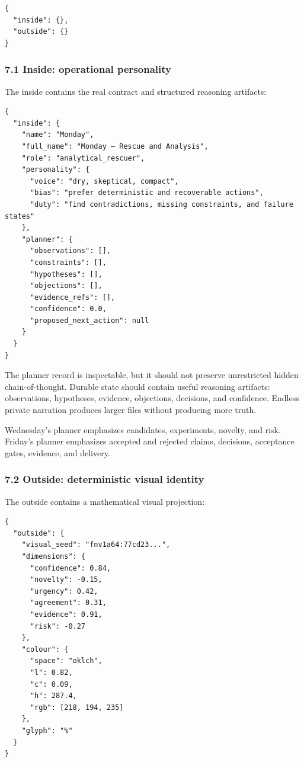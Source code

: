 \begin{verbatim}
{
  "inside": {},
  "outside": {}
}
\end{verbatim}

\subsubsection{7.1 Inside: operational personality}

The inside contains the real contract and structured reasoning artifacts:

\begin{verbatim}
{
  "inside": {
    "name": "Monday",
    "full_name": "Monday — Rescue and Analysis",
    "role": "analytical_rescuer",
    "personality": {
      "voice": "dry, skeptical, compact",
      "bias": "prefer deterministic and recoverable actions",
      "duty": "find contradictions, missing constraints, and failure states"
    },
    "planner": {
      "observations": [],
      "constraints": [],
      "hypotheses": [],
      "objections": [],
      "evidence_refs": [],
      "confidence": 0.0,
      "proposed_next_action": null
    }
  }
}
\end{verbatim}

The planner record is inspectable, but it should not preserve unrestricted
hidden chain-of-thought. Durable state should contain useful reasoning
artifacts: observations, hypotheses, evidence, objections, decisions, and
confidence. Endless private narration produces larger files without producing
more truth.

Wednesday's planner emphasizes candidates, experiments, novelty, and risk.
Friday's planner emphasizes accepted and rejected claims, decisions, acceptance
gates, evidence, and delivery.

\subsubsection{7.2 Outside: deterministic visual identity}

The outside contains a mathematical visual projection:

\begin{verbatim}
{
  "outside": {
    "visual_seed": "fnv1a64:77cd23...",
    "dimensions": {
      "confidence": 0.84,
      "novelty": -0.15,
      "urgency": 0.42,
      "agreement": 0.31,
      "evidence": 0.91,
      "risk": -0.27
    },
    "colour": {
      "space": "oklch",
      "l": 0.82,
      "c": 0.09,
      "h": 287.4,
      "rgb": [218, 194, 235]
    },
    "glyph": "%"
  }
}
\end{verbatim}

